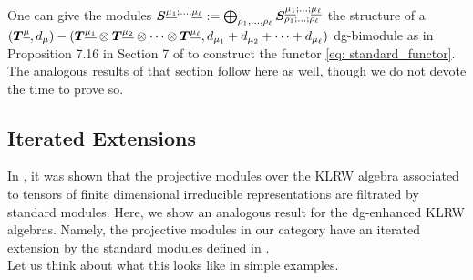 \documentclass{article}
\begin{document}
One can give the modules ${\boldsymbol{S}}^{\underline{\mu_1}; ... ;\underline{\mu_\ell}} := \bigoplus_{\rho_1,...,\rho_\ell} {\boldsymbol{S}}^{\underline{\mu_1}; ... ;\underline{\mu_\ell}}_{\rho_1;...;\rho_\ell}$ the structure of a $({\boldsymbol{T}}^{\underline{\mu}},d_\mu) - ({\boldsymbol{T}}^{\underline{\mu_1}} \otimes {\boldsymbol{T}}^{\underline{\mu_2}} \otimes \cdots \otimes {\boldsymbol{T}}^{\underline{\mu_\ell}}, d_{\mu_1} + d_{\mu_2} + \cdots + d_{\mu_\ell} )$ dg-bimodule as in Proposition 7.16 in Section 7 of \cite{Na} to construct the functor \eqref{eq: standard_functor}. The analogous results of that section follow here as well, though we do not devote the time to prove so.

\subsection{Iterated Extensions}
In \cite{Web}, it was shown that the projective modules over the KLRW algebra associated to tensors of finite dimensional irreducible representations are filtrated by standard modules. Here, we show an analogous result for the dg-enhanced KLRW algebras. Namely, the projective modules in our category have an iterated extension by the standard modules defined in \cite{Na}. \\
Let us think about what this looks like in simple examples. 
\end{document}
